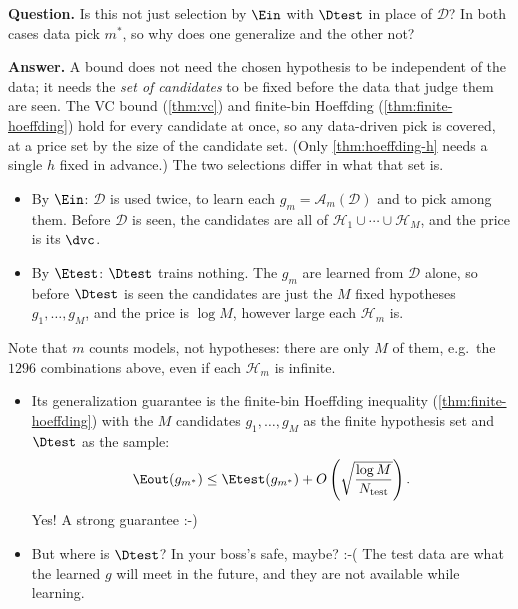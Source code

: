 \begin{remark}
    \textbf{Question.} Is this not just selection by \(\Ein\) with \(\Dtest\)
    in place of \(\mathcal{D}\)? In both cases data pick \(m^*\), so why does
    one generalize and the other not?

    \textbf{Answer.} A bound does not need the chosen hypothesis to be
    independent of the data; it needs the \emph{set of candidates} to be fixed
    before the data that judge them are seen. The VC bound (\autoref{thm:vc})
    and finite-bin Hoeffding (\autoref{thm:finite-hoeffding}) hold for every
    candidate at once, so any data-driven pick is covered, at a price set by
    the size of the candidate set. (Only \autoref{thm:hoeffding-h} needs a
    single \(h\) fixed in advance.) The two selections differ in what that set
    is.
    \begin{itemize}
        \item By \(\Ein\): \(\mathcal{D}\) is used twice, to learn each \(g_m =
            \mathcal{A}_m(\mathcal{D})\) and to pick among them. Before
            \(\mathcal{D}\) is seen, the candidates are all of \(\mathcal{H}_1
            \cup \cdots \cup \mathcal{H}_M\), and the price is its \(\dvc\).
        \item By \(\Etest\): \(\Dtest\) trains nothing. The \(g_m\) are learned
            from \(\mathcal{D}\) alone, so before \(\Dtest\) is seen the
            candidates are just the \(M\) fixed hypotheses \(g_1, \ldots,
            g_M\), and the price is \(\log M\), however large each
            \(\mathcal{H}_m\) is.
    \end{itemize}
    Note that \(m\) counts models, not hypotheses: there are only \(M\) of
    them, e.g.\ the \(1296\) combinations above, even if each \(\mathcal{H}_m\)
    is infinite.
\end{remark}

\begin{itemize}
    \item Its generalization guarantee is the finite-bin Hoeffding inequality
        (\autoref{thm:finite-hoeffding}) with the \(M\) candidates
        \(g_1, \ldots, g_M\) as the finite hypothesis set and \(\Dtest\) as the
        sample:
        \[
            \Eout(g_{m^*}) \le \Etest(g_{m^*}) + O \left( \sqrt{\frac{\log
            M}{N_{\mathrm{test}}}} \right) .
        \]
        Yes! A strong guarantee :-)
    \item But where is \(\Dtest\)? In your boss's safe, maybe? :-( The test
        data are what the learned \(g\) will meet in the future, and they are
        not available while learning.
\end{itemize}

